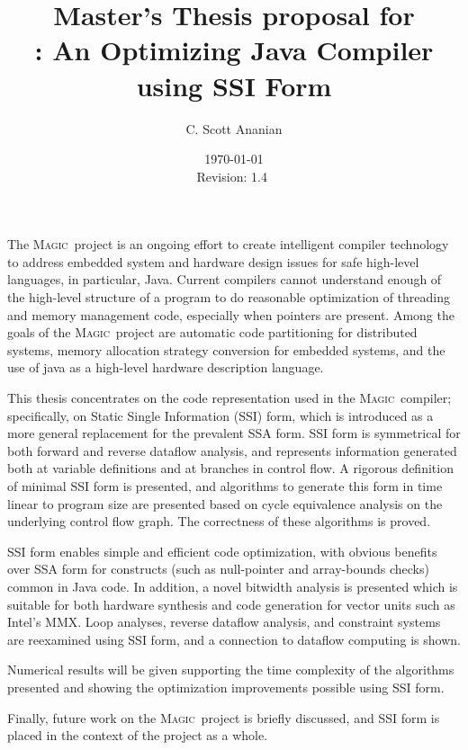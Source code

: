 \documentclass[12pt,notitlepage,twocolumn,twoside]{article}
\title{{\large Master's Thesis proposal for}\\
\magic: An Optimizing Java Compiler using SSI Form}
\author{C. Scott Ananian}
\date{\today \\ $ $Revision: 1.4 $ $}
\newcommand{\magic}{\textsc{Magic}}
\begin{document}
\pagestyle{myheadings}

\maketitle

The \magic\ project is an ongoing effort to create intelligent
compiler technology to address embedded system and hardware design
issues for safe high-level languages, in particular, Java.
Current compilers cannot understand enough of the high-level structure
of a program to do reasonable optimization of threading and memory
management code, especially when pointers are present. Among the goals
of the \magic\ project are automatic code partitioning for distributed
systems, memory allocation strategy conversion for embedded systems,
and the use of java as a high-level hardware description language.

This thesis concentrates on the code representation used in the
\magic\ compiler; specifically, on Static Single Information (SSI)
form, which is introduced as a more general replacement for the
prevalent SSA form.  SSI form is symmetrical for both forward and
reverse dataflow analysis, and represents information generated both
at variable definitions and at branches in control flow.  A rigorous
definition of minimal SSI form is presented, and algorithms to
generate this form in time linear to program size are
presented based on cycle equivalence analysis on the underlying
control flow graph.  The correctness of these algorithms is proved.

SSI form enables simple and efficient code optimization, with obvious
benefits over SSA form for constructs (such as null-pointer and
array-bounds checks) common in Java code.  In addition, a novel
bitwidth analysis is presented which is suitable for both hardware
synthesis and code generation for vector units such as Intel's MMX.
Loop analyses, reverse dataflow analysis, and constraint systems are
reexamined using SSI form, and a connection to dataflow computing is
shown.

Numerical results will be given supporting the time complexity of the
algorithms presented and showing the optimization improvements
possible using SSI form.

Finally, future work on the \magic\ project is briefly discussed, and
SSI form is placed in the context of the project as a whole.
\end{document}
